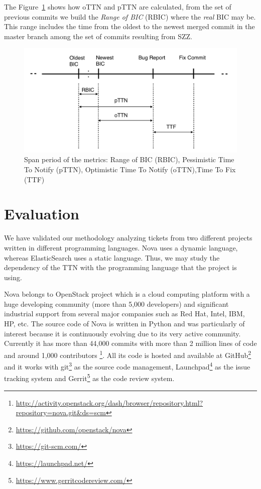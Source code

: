 \documentclass[10pt, conference]{IEEEtran}
\begin{document}

The Figure~\ref{fig:SZZmetrics} shows how oTTN and pTTN are calculated, from the set of previous commits we build the \emph{Range of BIC} (RBIC) where the \emph{real} BIC may be. This range includes the time from the oldest to the newest merged commit in the master branch among the set of commits resulting from SZZ.
  
\begin{figure}[ht]
\centering
\includegraphics[width=\columnwidth]{SZZmetrics.png}
\caption{ Span period of the metrics: Range of BIC (RBIC),  Pessimistic Time To Notify (pTTN), Optimistic Time To Notify (oTTN),Time To Fix (TTF) }
\label{fig:SZZmetrics}       %
\end{figure}

\section{Evaluation}
\label{sec:evaluation}

We have validated our methodology analyzing tickets from two different projects written in different programming languages. Nova uses a dynamic language, whereas ElasticSearch uses a static language. Thus, we may study the dependency of the TTN with the programming language that the project is using.

Nova belongs to OpenStack project which is a cloud computing platform with a huge developing community (more than 5,000 developers) and significant industrial support from several major companies such as Red Hat, Intel, IBM, HP, etc. The source code of Nova is written in Python and was particularly of interest because it is continuously evolving due to its very active community. Currently it has more than 44,000 commits with more than 2 million lines of code and around 1,000 contributors \footnote{\url{http://activity.openstack.org/dash/browser/repository.html?repository=nova.git&ds=scm}}. All its code is hosted and available at GitHub\footnote{\url{https://github.com/openstack/nova}} and it works with git\footnote{\url{https://git-scm.com/}} as the source code management, Launchpad\footnote{\url{https://launchpad.net/}} as the issue tracking system and Gerrit\footnote{\url{https://www.gerritcodereview.com/}} as the code review system.
\end{document}
